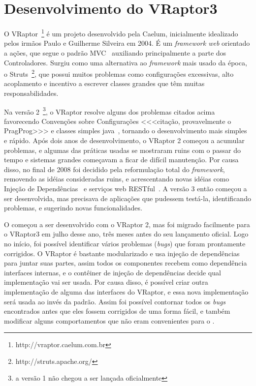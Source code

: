 \section{Desenvolvimento do VRaptor3}
\label{app:vraptor}

O VRaptor~\footnote{http://vraptor.caelum.com.br} é um projeto \opensource{} desenvolvido pela Caelum, inicialmente idealizado pelos irmãos Paulo e Guilherme Silveira em 2004. É um \textit{framework web} orientado a ações, que segue o padrão MVC~\cite{mvc} auxiliando principalmente a parte dos Controladores. Surgiu como uma alternativa ao \textit{framework} mais usado da época, o Struts~\footnote{http://struts.apache.org/}, que possui muitos problemas como configurações excessivas, alto acoplamento e incentivo a escrever classes grandes que têm muitas responsabilidades.

Na versão 2~\footnote{a versão 1 não chegou a ser lançada oficialmente}, o VRaptor resolve alguns dos problemas citados acima favorecendo Convenções sobre Configurações <<<citação, provavelmente o PragProg>>> e classes simples java~\cite{pojo}, tornando o desenvolvimento mais simples e rápido. Após dois anos de desenvolvimento, o VRaptor 2 começou a acumular problemas, e algumas das práticas usadas se mostraram ruins com o passar do tempo e sistemas grandes começavam a ficar de difícil manutenção. Por causa disso, no final de 2008 foi decidido pela reformulação total do \textit{framework}, removendo as idéias consideradas ruins, e acrescentando novas idéias como Injeção de Dependências~\cite{di} e serviços web RESTful~\cite{rest}. A versão 3 então começou a ser desenvolvida, mas precisava de aplicações que pudessem testá-la, identificando problemas, e sugerindo novas funcionalidades.

O \calopsita{} começou a ser desenvolvido com o VRaptor 2, mas foi migrado facilmente para o VRaptor3 em julho desse ano, três meses antes do seu lançamento oficial. Logo no início, foi possível identificar vários problemas (\textit{bugs}) que foram prontamente corrigidos. O VRaptor é bastante modularizado e usa injeção de dependências para juntar suas partes, assim todos os componentes recebem como dependência interfaces internas, e o contêiner de injeção de dependências decide qual implementação vai ser usada. Por causa disso, é possível criar outra implementação de alguma das interfaces do VRaptor, e essa nova implementação será usada ao invés da padrão. Assim foi possível contornar todos os \textit{bugs} encontrados antes que eles fossem corrigidos de uma forma fácil, e também modificar alguns comportamentos que não eram convenientes para o \calopsita.

